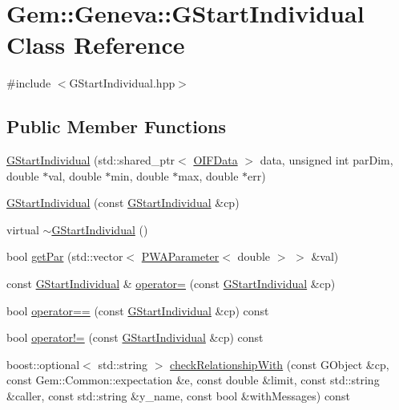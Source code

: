 \hypertarget{classGem_1_1Geneva_1_1GStartIndividual}{
\section{Gem::Geneva::GStartIndividual Class Reference}
\label{dd/d14/classGem_1_1Geneva_1_1GStartIndividual}
}


{\ttfamily \#include $<$GStartIndividual.hpp$>$}

\subsection*{Public Member Functions}
\begin{DoxyCompactItemize}
\item 
\hyperlink{classGem_1_1Geneva_1_1GStartIndividual_af12cc2d6bd870fa2574ef52a3f6a5802}{GStartIndividual} (std::shared\_\-ptr$<$ \hyperlink{classOIFData}{OIFData} $>$ data, unsigned int parDim, double $\ast$val, double $\ast$min, double $\ast$max, double $\ast$err)
\item 
\hyperlink{classGem_1_1Geneva_1_1GStartIndividual_ac6e59c84c2f7aa4400234906f7f1409a}{GStartIndividual} (const \hyperlink{classGem_1_1Geneva_1_1GStartIndividual}{GStartIndividual} \&cp)
\item 
virtual \hyperlink{classGem_1_1Geneva_1_1GStartIndividual_ac39a07f9e9829da80f9eae7277ee5982}{$\sim$GStartIndividual} ()
\item 
bool \hyperlink{classGem_1_1Geneva_1_1GStartIndividual_a038ae274cb482688e6f81c158f1f1726}{getPar} (std::vector$<$ \hyperlink{classPWAParameter}{PWAParameter}$<$ double $>$ $>$ \&val)
\item 
const \hyperlink{classGem_1_1Geneva_1_1GStartIndividual}{GStartIndividual} \& \hyperlink{classGem_1_1Geneva_1_1GStartIndividual_ac490d0618fbf311eb90768fc090c63aa}{operator=} (const \hyperlink{classGem_1_1Geneva_1_1GStartIndividual}{GStartIndividual} \&cp)
\item 
bool \hyperlink{classGem_1_1Geneva_1_1GStartIndividual_a24c9a1156f06dad45afb2fc52d73ca47}{operator==} (const \hyperlink{classGem_1_1Geneva_1_1GStartIndividual}{GStartIndividual} \&cp) const 
\item 
bool \hyperlink{classGem_1_1Geneva_1_1GStartIndividual_abf9e54ba75293a2cf4d9cc8ca7716f63}{operator!=} (const \hyperlink{classGem_1_1Geneva_1_1GStartIndividual}{GStartIndividual} \&cp) const 
\item 
boost::optional$<$ std::string $>$ \hyperlink{classGem_1_1Geneva_1_1GStartIndividual_af821f39180d83fcb61b7cd49a2679a4f}{checkRelationshipWith} (const GObject \&cp, const Gem::Common::expectation \&e, const double \&limit, const std::string \&caller, const std::string \&y\_\-name, const bool \&withMessages) const 
\end{DoxyCompactItemize}
